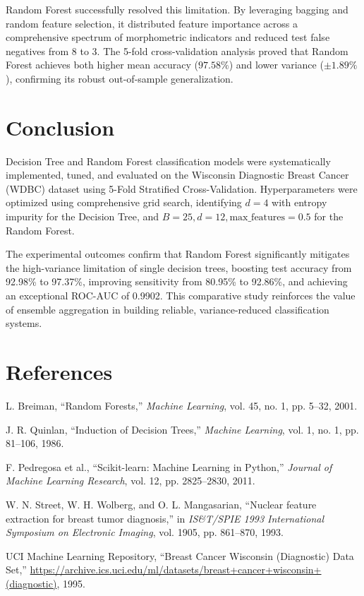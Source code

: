 \documentclass[12pt,a4paper]{article}
\begin{document}
Random Forest successfully resolved this limitation. By leveraging bagging and random feature selection, it distributed feature importance across a comprehensive spectrum of morphometric indicators and reduced test false negatives from 8 to 3. The 5-fold cross-validation analysis proved that Random Forest achieves both higher mean accuracy ($97.58\%$) and lower variance ($\pm 1.89\%$), confirming its robust out-of-sample generalization.

\section{Conclusion}
Decision Tree and Random Forest classification models were systematically implemented, tuned, and evaluated on the Wisconsin Diagnostic Breast Cancer (WDBC) dataset using 5-Fold Stratified Cross-Validation. Hyperparameters were optimized using comprehensive grid search, identifying $d=4$ with entropy impurity for the Decision Tree, and $B=25, d=12, \text{max\_features}=0.5$ for the Random Forest.

The experimental outcomes confirm that Random Forest significantly mitigates the high-variance limitation of single decision trees, boosting test accuracy from 92.98\% to 97.37\%, improving sensitivity from 80.95\% to 92.86\%, and achieving an exceptional ROC-AUC of 0.9902. This comparative study reinforces the value of ensemble aggregation in building reliable, variance-reduced classification systems.

\section{References}
\begin{enumerate}[label={[\arabic*]}]
\item L. Breiman, ``Random Forests,'' \textit{Machine Learning}, vol. 45, no. 1, pp. 5--32, 2001.
\item J. R. Quinlan, ``Induction of Decision Trees,'' \textit{Machine Learning}, vol. 1, no. 1, pp. 81--106, 1986.
\item F. Pedregosa et al., ``Scikit-learn: Machine Learning in Python,'' \textit{Journal of Machine Learning Research}, vol. 12, pp. 2825--2830, 2011.
\item W. N. Street, W. H. Wolberg, and O. L. Mangasarian, ``Nuclear feature extraction for breast tumor diagnosis,'' in \textit{IS\&T/SPIE 1993 International Symposium on Electronic Imaging}, vol. 1905, pp. 861--870, 1993.
\item UCI Machine Learning Repository, ``Breast Cancer Wisconsin (Diagnostic) Data Set,'' \url{https://archive.ics.uci.edu/ml/datasets/breast+cancer+wisconsin+(diagnostic)}, 1995.
\end{enumerate}
\end{document}
